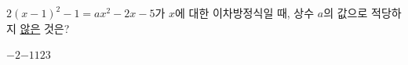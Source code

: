 $2(x-1)^2-1=ax^2-2x-5$가 $x$에 대한 이차방정식일 때, 상수 $a$의 값으로 적당하지 \underline{않은} 것은?
\begin{choices32}{$-2$}{$-1$}{$1$}{$2$}{$3$}\end{choices32}
